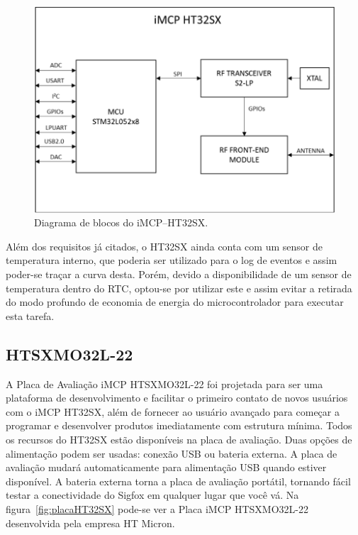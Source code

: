 \begin{figure}
  \caption{Diagrama de blocos do iMCP–HT32SX.}
  \begin{center}
      \includegraphics[scale=0.5]{img/imcpHT32sx.png}
  \end{center}
  \label{fig:blockHT32SX}
\end{figure}

Além dos requisitos já citados, o HT32SX ainda conta com um sensor de temperatura interno, que poderia ser utilizado para o log de eventos e assim poder-se traçar a curva desta. Porém, devido a disponibilidade de um sensor de temperatura dentro do RTC, optou-se por utilizar este e assim evitar a retirada do modo profundo de economia de energia do microcontrolador para executar esta tarefa.
\subsection{HTSXMO32L-22}
A Placa de Avaliação iMCP HTSXMO32L-22 foi projetada para ser uma plataforma de desenvolvimento e facilitar o primeiro contato de novos usuários com o iMCP HT32SX, além de fornecer ao usuário avançado para começar a programar e desenvolver produtos imediatamente com estrutura mínima. Todos os recursos do HT32SX estão disponíveis na placa de avaliação. Duas opções de alimentação podem ser usadas: conexão USB ou bateria externa. A placa de avaliação mudará automaticamente para alimentação USB quando estiver disponível. A bateria externa torna a placa de avaliação portátil, tornando fácil testar a conectividade do Sigfox em qualquer lugar que você vá. Na figura~\ref{fig:placaHT32SX} pode-se ver a Placa iMCP HTSXMO32L-22 desenvolvida pela empresa HT Micron.

